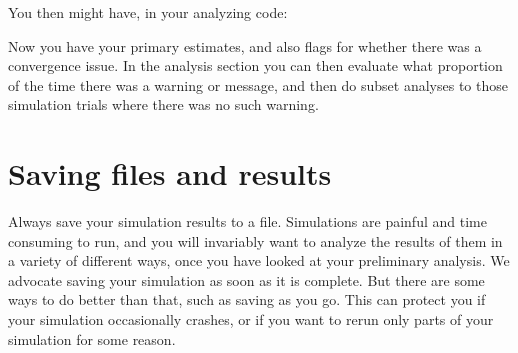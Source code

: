 \documentclass[
]{book}
\newenvironment{Shaded}{\begin{snugshade}}{\end{snugshade}}
\newcommand{\AttributeTok}[1]{\textcolor[rgb]{0.77,0.63,0.00}{#1}}
\newcommand{\CommentTok}[1]{\textcolor[rgb]{0.56,0.35,0.01}{\textit{#1}}}
\newcommand{\ControlFlowTok}[1]{\textcolor[rgb]{0.13,0.29,0.53}{\textbf{#1}}}
\newcommand{\DecValTok}[1]{\textcolor[rgb]{0.00,0.00,0.81}{#1}}
\newcommand{\FunctionTok}[1]{\textcolor[rgb]{0.00,0.00,0.00}{#1}}
\newcommand{\NormalTok}[1]{#1}
\newcommand{\OtherTok}[1]{\textcolor[rgb]{0.56,0.35,0.01}{#1}}
\newcommand{\SpecialCharTok}[1]{\textcolor[rgb]{0.00,0.00,0.00}{#1}}
\newcommand{\StringTok}[1]{\textcolor[rgb]{0.31,0.60,0.02}{#1}}
\begin{document}
You then might have, in your analyzing code:

\begin{Shaded}
\end{Shaded}

Now you have your primary estimates, and also flags for whether there was a convergence issue.
In the analysis section you can then evaluate what proportion of the time there was a warning or message, and then do subset analyses to those simulation trials where there was no such warning.

\hypertarget{saving-files-and-results}{%
\section{Saving files and results}\label{saving-files-and-results}}

Always save your simulation results to a file.
Simulations are painful and time consuming to run, and you will invariably want to analyze the results of them in a variety of different ways, once you have looked at your preliminary analysis.
We advocate saving your simulation as soon as it is complete.
But there are some ways to do better than that, such as saving as you go.
This can protect you if your simulation occasionally crashes, or if you want to rerun only parts of your simulation for some reason.
\end{document}
